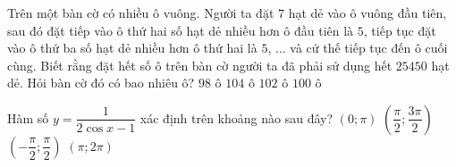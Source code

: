 \begin{ex}%
	Trên một bàn cờ có nhiều ô vuông. Người ta đặt $7$ hạt dẻ vào ô vuông đầu tiên, sau đó đặt tiếp vào ô thứ hai số hạt dẻ nhiều hơn ô đầu tiên là $5$, tiếp tục đặt vào ô thứ ba số hạt dẻ nhiều hơn ô thứ hai là $5$, $\ldots$ và cứ thế tiếp tục đến ô cuối cùng. Biết rằng đặt hết số ô trên bàn cờ người ta đã phải sử dụng hết $25450$ hạt dẻ. Hỏi bàn cờ đó có bao nhiêu ô?
	\choice
	{$98$ ô}
	{$104$ ô}
	{$102$ ô}
	{\True $100$ ô}
\end{ex}
\begin{ex}%
	Hàm số $y=\dfrac{1}{2\cos x-1}$ xác định trên khoảng nào sau đây?
	\choice
	{$(0;\pi)$}
	{$\left(\dfrac{\pi}{2};\dfrac{3\pi}{2}\right)$}
	{$\left(-\dfrac{\pi}{2};\dfrac{\pi}{2}\right)$}
	{\True $(\pi;2\pi)$}
\end{ex}
